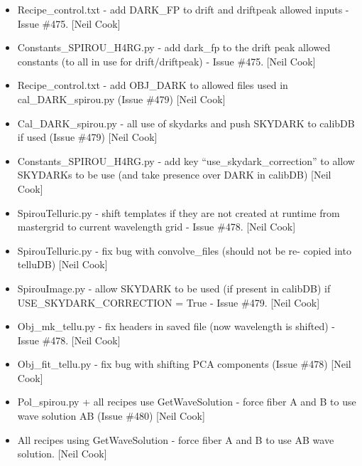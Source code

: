 \documentclass[a4paper,10pt,english]{report}
\begin{document}
\begin{itemize}
\item {} 
Recipe\_control.txt - add DARK\_FP to drift and driftpeak allowed inputs
- Issue \#475. {[}Neil Cook{]}

\item {} 
Constants\_SPIROU\_H4RG.py - add dark\_fp to the drift peak allowed
constants (to all in use for drift/driftpeak) - Issue \#475. {[}Neil
Cook{]}

\item {} 
Recipe\_control.txt - add OBJ\_DARK to allowed files used in
cal\_DARK\_spirou.py (Issue \#479) {[}Neil Cook{]}

\item {} 
Cal\_DARK\_spirou.py - all use of skydarks and push SKYDARK to calibDB
if used (Issue \#479) {[}Neil Cook{]}

\item {} 
Constants\_SPIROU\_H4RG.py - add key “use\_skydark\_correction” to allow
SKYDARKs to be use (and take presence over DARK in calibDB) {[}Neil
Cook{]}

\item {} 
SpirouTelluric.py - shift templates if they are not created at runtime
from mastergrid to current wavelength grid - Issue \#478. {[}Neil Cook{]}

\item {} 
SpirouTelluric.py - fix bug with convolve\_files (should not be re-
copied into telluDB) {[}Neil Cook{]}

\item {} 
SpirouImage.py - allow SKYDARK to be used (if present in calibDB) if
USE\_SKYDARK\_CORRECTION = True - Issue \#479. {[}Neil Cook{]}

\item {} 
Obj\_mk\_tellu.py - fix headers in saved file (now wavelength is
shifted) - Issue \#478. {[}Neil Cook{]}

\item {} 
Obj\_fit\_tellu.py - fix bug with shifting PCA components (Issue \#478)
{[}Neil Cook{]}

\item {} 
Pol\_spirou.py + all recipes use GetWaveSolution - force fiber A and B
to use wave solution AB (Issue \#480) {[}Neil Cook{]}

\item {} 
All recipes using GetWaveSolution - force fiber A and B to use AB wave
solution. {[}Neil Cook{]}

\end{itemize}
\end{document}
